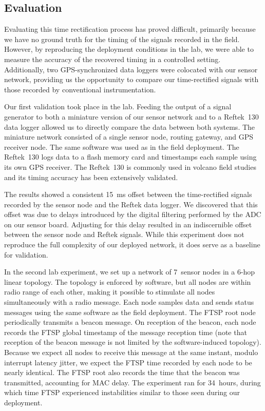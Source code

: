 \subsection{Evaluation}
\label{evaluation-timing-postdeployment}

Evaluating this time rectification process has proved difficult, primarily
because we have no ground truth for the timing of the signals recorded in the
field. However, by reproducing the deployment conditions in the lab, we were
able to measure the accuracy of the recovered timing in a controlled setting.
Additionally, two GPS-synchronized data loggers were colocated with our
sensor network, providing us the opportunity to compare our time-rectified
signals with those recorded by conventional instrumentation.

\vfill\eject

Our first validation took place in the lab. Feeding the output of a signal
generator to both a miniature version of our sensor network and to a
Reftek~130 data logger allowed us to directly compare the data between both
systems. The miniature network consisted of a single sensor node, routing
gateway, and GPS receiver node. The same software was used as in the field
deployment. The Reftek~130 logs data to a flash memory card and timestamps
each sample using its own GPS receiver. The Reftek~130 is commonly used in
volcano field studies and its timing accuracy has been extensively validated.

The results showed a consistent 15~ms offset between the time-rectified
signals recorded by the sensor node and the Reftek data logger. We discovered
that this offset was due to delays introduced by the digital filtering
performed by the ADC on our sensor board. Adjusting for this delay resulted
in an indiscernible offset between the sensor node and Reftek signals. While
this experiment does not reproduce the full complexity of our deployed
network, it does serve as a baseline for validation.

In the second lab experiment, we set up a network of 7~sensor nodes in a
6-hop linear topology. The topology is enforced by software, but all nodes
are within radio range of each other, making it possible to stimulate all
nodes simultaneously with a radio message. Each node samples data and sends
status messages using the same software as the field deployment. The FTSP
root node periodically transmits a beacon message. On reception of the
beacon, each node records the FTSP global timestamp of the message reception
time (note that reception of the beacon message is not limited by the
software-induced topology). Because we expect all nodes to receive this
message at the same instant, modulo interrupt latency jitter, we expect the
FTSP time recorded by each node to be nearly identical. The FTSP root also
records the time that the beacon was transmitted, accounting for MAC delay.
The experiment ran for 34~hours, during which time FTSP experienced
instabilities similar to those seen during our deployment.

